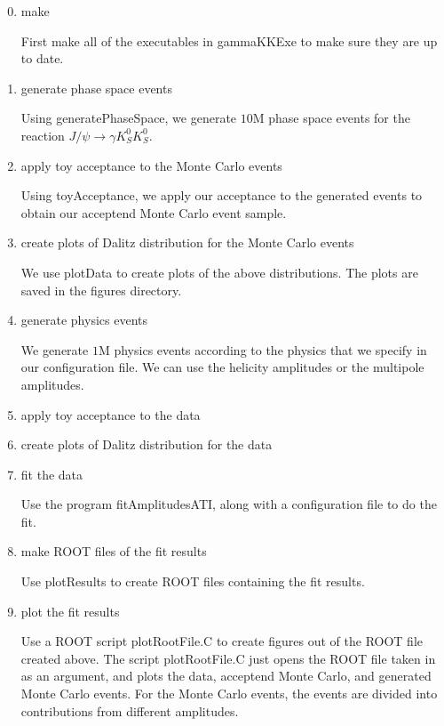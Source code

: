 \documentclass[11pt]{article}
\begin{document}
\begin{enumerate}
\setcounter{enumi}{-1}

\item make

  First make all of the executables in gammaKKExe to make sure they
  are up to date.

\item generate phase space events

  Using generatePhaseSpace, we generate $10$M phase space events for
  the reaction $J/\psi \to \gamma K_{S}^{0} K_{S}^{0}$.

\item apply toy acceptance to the Monte Carlo events

  Using toyAcceptance, we apply our acceptance to the generated events
  to obtain our acceptend Monte Carlo event sample.

\item create plots of Dalitz distribution for the Monte Carlo events

We use plotData to create plots of the above distributions. The plots
are saved in the figures directory.

\item generate physics events

We generate $1$M physics events according to the physics that we
specify in our configuration file. We can use the helicity amplitudes
or the multipole amplitudes.

\item apply toy acceptance to the data

\item create plots of Dalitz distribution for the data

\item fit the data

Use the program fitAmplitudesATI, along with a configuration file to
do the fit.

\item make ROOT files of the fit results

Use plotResults to create ROOT files containing the fit results.

\item plot the fit results

Use a ROOT script plotRootFile.C to create figures out of the ROOT
file created above. The script plotRootFile.C just opens the ROOT
file taken in as an argument, and plots the data, acceptend Monte
Carlo, and generated Monte Carlo events. For the Monte Carlo events,
the events are divided into contributions from different amplitudes.

\end{enumerate}
\end{document}
